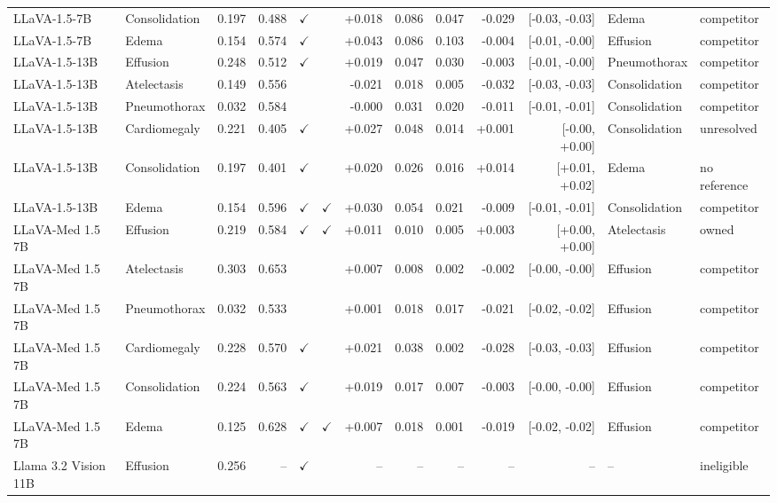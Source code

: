 \begin{longtable}{llrrccrrrrrll}
LLaVA-1.5-7B & Consolidation & 0.197 & 0.488 & $\checkmark$ &  & +0.018 & 0.086 & 0.047 & -0.029 & [-0.03, -0.03] & Edema & competitor \\
LLaVA-1.5-7B & Edema & 0.154 & 0.574 & $\checkmark$ &  & +0.043 & 0.086 & 0.103 & -0.004 & [-0.01, -0.00] & Effusion & competitor \\
LLaVA-1.5-13B & Effusion & 0.248 & 0.512 & $\checkmark$ &  & +0.019 & 0.047 & 0.030 & -0.003 & [-0.01, -0.00] & Pneumothorax & competitor \\
LLaVA-1.5-13B & Atelectasis & 0.149 & 0.556 &  &  & -0.021 & 0.018 & 0.005 & -0.032 & [-0.03, -0.03] & Consolidation & competitor \\
LLaVA-1.5-13B & Pneumothorax & 0.032 & 0.584 &  &  & -0.000 & 0.031 & 0.020 & -0.011 & [-0.01, -0.01] & Consolidation & competitor \\
LLaVA-1.5-13B & Cardiomegaly & 0.221 & 0.405 & $\checkmark$ &  & +0.027 & 0.048 & 0.014 & +0.001 & [-0.00, +0.00] & Consolidation & unresolved \\
LLaVA-1.5-13B & Consolidation & 0.197 & 0.401 & $\checkmark$ &  & +0.020 & 0.026 & 0.016 & +0.014 & [+0.01, +0.02] & Edema & no reference \\
LLaVA-1.5-13B & Edema & 0.154 & 0.596 & $\checkmark$ & $\checkmark$ & +0.030 & 0.054 & 0.021 & -0.009 & [-0.01, -0.01] & Consolidation & competitor \\
\rowcolor{cfSlate2}LLaVA-Med 1.5 7B & Effusion & 0.219 & 0.584 & $\checkmark$ & $\checkmark$ & +0.011 & 0.010 & 0.005 & +0.003 & [+0.00, +0.00] & Atelectasis & owned \\
LLaVA-Med 1.5 7B & Atelectasis & 0.303 & 0.653 &  &  & +0.007 & 0.008 & 0.002 & -0.002 & [-0.00, -0.00] & Effusion & competitor \\
LLaVA-Med 1.5 7B & Pneumothorax & 0.032 & 0.533 &  &  & +0.001 & 0.018 & 0.017 & -0.021 & [-0.02, -0.02] & Effusion & competitor \\
LLaVA-Med 1.5 7B & Cardiomegaly & 0.228 & 0.570 & $\checkmark$ &  & +0.021 & 0.038 & 0.002 & -0.028 & [-0.03, -0.03] & Effusion & competitor \\
LLaVA-Med 1.5 7B & Consolidation & 0.224 & 0.563 & $\checkmark$ &  & +0.019 & 0.017 & 0.007 & -0.003 & [-0.00, -0.00] & Effusion & competitor \\
LLaVA-Med 1.5 7B & Edema & 0.125 & 0.628 & $\checkmark$ & $\checkmark$ & +0.007 & 0.018 & 0.001 & -0.019 & [-0.02, -0.02] & Effusion & competitor \\
Llama 3.2 Vision 11B & Effusion & 0.256 & -- & $\checkmark$ & & -- & -- & -- & -- & -- & -- & ineligible \\

\end{longtable}
